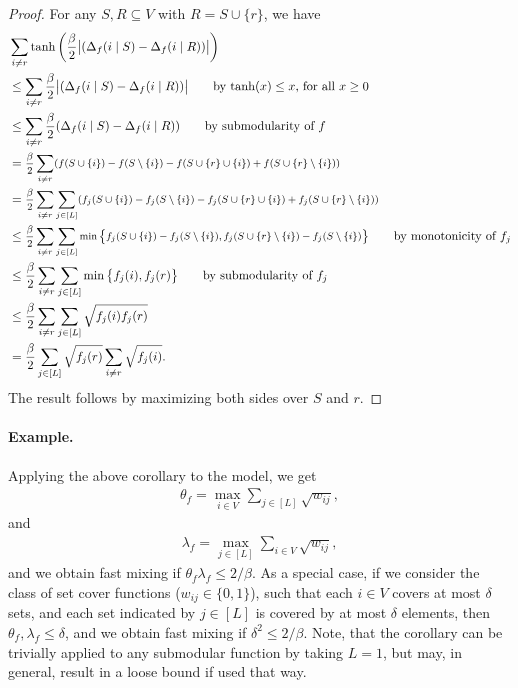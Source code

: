 \begin{proof}
  For any $S, R \subseteq V$ with $R = S \cup \{r\}$, we have
  \begin{align*}
  	&\sum_{i \neq r} \tanh \left(\frac{\beta}{2}\big|(\D_f(i\mid S) - \D_f(i\mid R)) \big|\right)\\
    &\leq \sum_{i \neq r} \frac{\beta}{2}\big|(\D_f(i\mid S) - \D_f(i\mid R)) \big| \tag*{by $\tanh(x) \leq x$, for all $x \geq 0$}\\
    &\leq \sum_{i \neq r} \frac{\beta}{2}(\D_f(i\mid S) - \D_f(i\mid R)) \tag*{by submodularity of $f$}\\
    &= \medmath{\frac{\beta}{2}\sum_{i \neq r}(f(S \cup \{i\}) - f(S \setminus \{i\}) - f(S \cup \{r\} \cup \{i\}) + f(S \cup \{r\} \setminus \{i\}))}\\
    &= \medmath{\frac{\beta}{2}\sum_{i \neq r}\sum_{j \in [L]}(f_{j}(S \cup \{i\}) - f_{j}(S \setminus \{i\}) - f_{j}(S \cup \{r\} \cup \{i\}) + f_{j}(S \cup \{r\} \setminus \{i\}))}\\
    &\leq \medmath{\frac{\beta}{2}\sum_{i \neq r}\sum_{j \in [L]}\min\big\{f_{j}(S \cup \{i\}) - f_{j}(S \setminus \{i\}),f_{j}(S \cup \{r\} \setminus \{i\}) - f_{j}(S \setminus \{i\})\big\}} \tag*{by monotonicity of $f_{j}$}\\
    &\leq \frac{\beta}{2}\sum_{i \neq r}\sum_{j \in [L]}\min\big\{f_{j}(i), f_{j}(r)\big\} \tag*{by submodularity of $f_{j}$}\\
    &\leq \frac{\beta}{2}\sum_{i \neq r}\sum_{j \in [L]}\sqrt{f_{j}(i) f_{j}(r)}\\
    &= \frac{\beta}{2}\sum_{j \in [L]}\sqrt{f_{j}(r)}\sum_{i \neq r}\sqrt{ f_{j}(i)}.
  \end{align*}
  The result follows by maximizing both sides over $S$ and $r$.
\end{proof}

\paragraph{Example.}Applying the above corollary to the \flid{} model, we get
\begin{align*}
\theta_f = \max_{i \in V} \sum_{j \in [L]} \sqrt{w_{ij}},
\end{align*}
and
\begin{align*}
\lambda_f = \max_{j \in [L]} \sum_{i \in V} \sqrt{w_{ij}},
\end{align*}
and we obtain fast mixing if $\theta_f \lambda_f \leq 2/\beta$.
As a special case, if we consider the class of set cover functions ($w_{ij} \in \{0, 1\}$), such that each $i \in V$ covers at most $\delta$ sets, and each set indicated by $j \in [L]$ is covered by at most $\delta$ elements, then $\theta_f, \lambda_f \leq \delta$, and we obtain fast mixing if $\delta^2 \leq 2/\beta$.
Note, that the corollary can be trivially applied to any submodular function by taking $L=1$, but may, in general, result in a loose bound if used that way.

